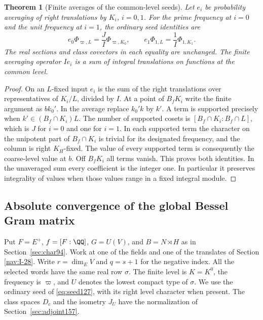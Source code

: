 \documentclass[a4paper,11pt]{article}
\newtheorem{theorem}[proposition]{Theorem}
\theoremstyle{definition}
\theoremstyle{remark}
\numberwithin{equation}{section}
\begin{document}
\begin{theorem}[Finite averages of the common-level seeds]
\label{thm:common159}
Let \(e_i\) be probability averaging of right translations by
\(K_i\), \(i=0,1\). For the prime frequency at \(i=0\) and
the unit frequency at \(i=1\), the ordinary seed identities are
\[
 e_0\Phi_{\varpi,L}=\frac{J}{I}\Phi_{\varpi,K_0},
       \qquad e_1\Phi_{1,L}=\frac1I\Phi_{1,K_1}.
\]
The real sections and class covectors in each equality are
unchanged. The finite averaging operator \(I e_i\) is a sum
of integral translations on functions at the common level.
\end{theorem}
\begin{proof}
On an \(L\)-fixed input \(e_i\) is the sum of the right
translations over representatives of \(K_i/L\), divided by
\(I\). At a point of \(B_fK_i\) write the finite argument as
\(bk_0'\). In the average replace \(k_0'k\) by \(k'\).
A term is supported precisely when
\(k'\in(B_f\cap K_i)L\). The number of supported cosets is
\([B_f\cap K_i:B_f\cap L]\), which is \(J\) for \(i=0\)
and one for \(i=1\). In each supported term the character
on the unipotent part of \(B_f\cap K_i\) is trivial for its
designated frequency, and the column is right \(K_H\)-fixed.
The value of every supported term is consequently the
coarse-level value at \(b\). Off \(B_fK_i\) all terms vanish.
This proves both identities. In the unaveraged sum every
coefficient is the integer one. In particular it preserves
integrality of values when those values range in a fixed
integral module.
\end{proof}

\subsection{Absolute convergence of the global Bessel Gram matrix}\label{nav:VII-11}
\label{sec:absolute163}

Put \(F=E^+\), \(f=[F:\QQ]\), \(G=U(V)\), and \(B=N\rtimes H\)
as in Section~\ref{sec:char94}. Work at one of the fields and one
of the translates of Section \ref{nav:I-28}. Write \(r=\dim_E V\)
and \(q=s+1\) for the negative index. All the selected words have
the same real row \(\sigma\). The finite level is \(K=K^0\), the
frequency is \(\varpi\), and \(U\) denotes the lowest compact
type of \(\sigma\). We use the ordinary seed of
\eqref{eq:seed127}, with its right level character when present.
The class spaces \(D_c\) and the isometry \(J_U\) have the
normalization of Section~\ref{sec:adjoint157}.
\end{document}
